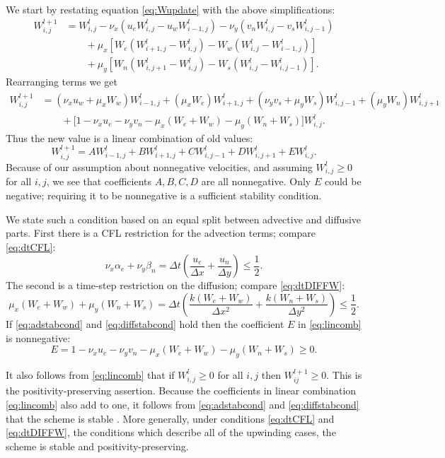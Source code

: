 \documentclass[11pt,final]{amsart}
\newcommand{\Wlij}{W^l_{i,j}}
\begin{document}
We start by restating equation \eqref{eq:Wupdate} with the above simplifications:
\begin{align*}
 W_{i,j}^{l+1} &= \Wlij - \nu_x \left(u_e \Wlij - u_w W_{i-1,j}^l\right) - \nu_y \left(v_n \Wlij - v_s W_{i,j-1}^l\right)  \\
      &\qquad + \mu_x \left[W_e \left(W_{i+1,j}^l - \Wlij\right) - W_w \left(\Wlij - W_{i-1,j}^l\right)\right]  \\
      &\qquad + \mu_y \left[W_n \left(W_{i,j+1}^l - \Wlij\right) - W_s \left(\Wlij - W_{i,j-1}^l\right)\right].
\end{align*}
Rearranging terms we get
\begin{align*}
 W_{i,j}^{l+1} &= (\nu_x u_w + \mu_x W_w) W_{i-1,j}^l + (\mu_x W_e) W_{i+1,j}^l + (\nu_y v_s + \mu_y W_s) W_{i,j-1}^l + (\mu_y W_n) W_{i,j+1}^l \\
      &\qquad + \Big[1 - \nu_x u_e - \nu_y v_n - \mu_x (W_e + W_w) - \mu_y (W_n + W_s)\Big] \Wlij.
\end{align*}
Thus the new value is a linear combination of old values:
\begin{equation}
W_{i,j}^{l+1} = A W_{i-1,j}^l + B W_{i+1,j}^l + C W_{i,j-1}^l + D W_{i,j+1}^l + E \Wlij. \label{eq:lincomb}
\end{equation}
Because of our assumption about nonnegative velocities, and assuming $\Wlij \ge 0$ for all $i,j$, we see that coefficients $A,B,C,D$ are all nonnegative.  Only $E$ could be negative; requiring it to be nonnegative is a sufficient stability condition.

We state such a condition based on an equal split between advective and diffusive parts.  First there is a CFL restriction for the advection terms; compare \eqref{eq:dtCFL}:
\begin{equation}
\nu_x \alpha_e + \nu_y \beta_n = \Delta t \left(\frac{u_e}{\Delta x} + \frac{u_n}{\Delta y}\right) \le \frac{1}{2}. \label{eq:adstabcond}
\end{equation}
The second is a time-step restriction on the diffusion; compare \eqref{eq:dtDIFFW}:
\begin{equation}
\mu_x (W_e + W_w) + \mu_y (W_n + W_s) = \Delta t \left(\frac{k (W_e + W_w)}{\Delta x^2} + \frac{k (W_n + W_s)}{\Delta y^2}\right) \le \frac{1}{2}. \label{eq:diffstabcond}
\end{equation}
If \eqref{eq:adstabcond} and \eqref{eq:diffstabcond} hold then the coefficient $E$ in \eqref{eq:lincomb} is nonnegative:
	$$E = 1 - \nu_x u_e - \nu_y v_n - \mu_x (W_e + W_w) - \mu_y (W_n + W_s) \ge 0.$$

It also follows from \eqref{eq:lincomb} that if $\Wlij\ge 0$ for all $i,j$ then $W_{ij}^{l+1}\ge 0$.  This is the positivity-preserving assertion.  Because the coefficients in linear combination \eqref{eq:lincomb} also add to one, it follows  from \eqref{eq:adstabcond} and \eqref{eq:diffstabcond} that the scheme is stable \citep{MortonMayers}.  More generally, under conditions \eqref{eq:dtCFL} and \eqref{eq:dtDIFFW}, the conditions which describe all of the upwinding cases, the scheme is stable and positivity-preserving.
\end{document}
